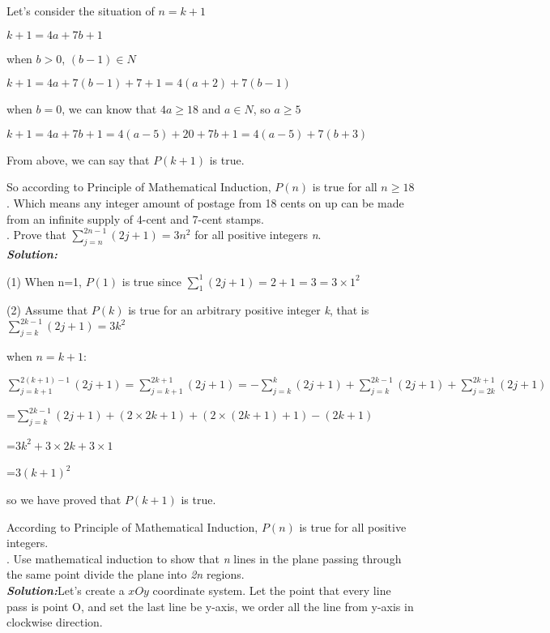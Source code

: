 \documentclass[11pt, oneside]{article}   	%
\begin{document}
Let's consider the situation of $n=k+1$

\qquad $k+1=4a+7b+1$

when $b>0$, $(b-1)\in N$

\qquad $k+1=4a+7(b-1)+7+1=4(a+2)+7(b-1)$

when $b=0$, we can know that $4a\ge18$ and $a\in N$, so $a\ge 5$

\qquad $k+1=4a+7b+1=4(a-5)+20+7b+1=4(a-5)+7(b+3)$

From above, we can say that $P(k+1)$ is true.

So according to Principle of Mathematical Induction, $P(n)$ is true for all $n\ge 18$. Which means any integer amount of postage from 18 cents on up can be made from an infinite supply of 4-cent and 7-cent stamps.\\

. Prove that $\sum\limits_{j=n}^{2n-1}(2j+1)=3n^{2}$ for all positive integers \emph{n}.\\
\textbf{\emph{Solution:}}

(1) When n=1, $P(1)$ is true since $\sum\limits_{1}^{1}(2j+1)=2+1=3=3\times 1^{2}$

(2) Assume that $P(k)$ is true for an arbitrary positive integer \emph{k}, that is $\sum\limits_{j=k}^{2k-1}(2j+1)=3k^{2}$

when $n=k+1$:

$\sum\limits_{j=k+1}^{2(k+1)-1}(2j+1)=\sum\limits_{j=k+1}^{2k+1}(2j+1)=-\sum\limits_{j=k}^{k}(2j+1)+\sum\limits_{j=k}^{2k-1}(2j+1)+\sum\limits_{j=2k}^{2k+1}(2j+1)$

=$\sum\limits_{j=k}^{2k-1}(2j+1)+(2\times 2k+1)+(2\times(2k+1)+1)-(2k+1)$

=$3k^{2}+3\times 2k+ 3\times 1$

=$3(k+1)^{2}$

so we have proved that $P(k+1)$ is true.

According to Principle of Mathematical Induction, $P(n)$ is true for all positive integers.\\

. Use mathematical induction to show that \emph{n} lines in the plane passing through the same point divide the plane into \emph{2n} regions.\\
\textbf{\emph{Solution:}}Let's create a $xOy$ coordinate system. Let the point that every line pass is point O, and set the last line be y-axis, we order all the line from y-axis in clockwise direction. 

\end{document}

